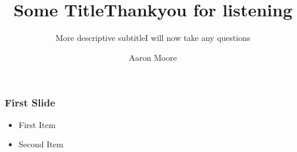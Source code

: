 \documentclass[]{beamer}
\title{Some Title}
\subtitle{More descriptive subtitle}
\author{Aaron Moore}
\date{}
\begin{document}
\frame{\titlepage}


\begin{frame}
	\frametitle{First Slide}
	\begin{itemize}
		\item<1->{First Item}
		\item<2->{Second Item}
	\end{itemize}
\end{frame}

\title{Thankyou for listening}
\subtitle{I will now take any questions}
\author{}
\frame{\titlepage}

\end{document}
